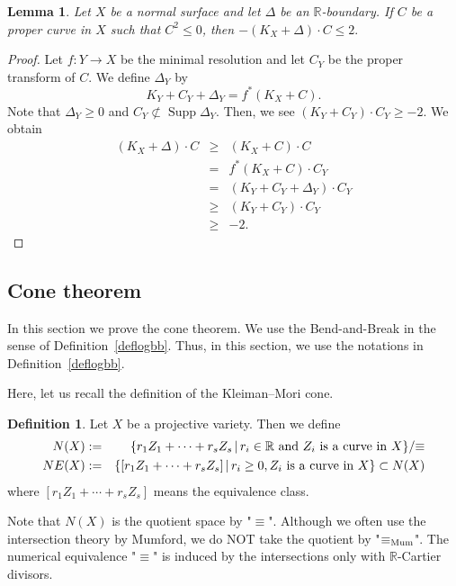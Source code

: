 \documentclass[12pt,twoside]{amsart}
\newcommand{\Supp}[0]{{\operatorname{Supp}}}
\newtheorem{lem}[thm]{Lemma}
\theoremstyle{definition}
\newtheorem{dfn}[thm]{Definition}
\begin{document}
\begin{lem}\label{negative-length2}
Let $X$ be a normal surface and 
let $\Delta$ be an $\mathbb R$-boundary. 
If $C$ be a proper curve in $X$ such that $C^2\leq 0$, then $-(K_X+\Delta)\cdot C\leq 2.$
\end{lem}

\begin{proof}
Let $f:Y\to X$ be the minimal resolution and 
let $C_Y$ be the proper transform of $C$. 
We define $\Delta_Y$ by 
$$K_Y+C_Y+\Delta_Y=f^*(K_X+C).$$
Note that $\Delta_Y\geq 0$ and $C_Y\not\subset \Supp \Delta_Y.$ 
Then, we see $(K_Y+C_Y)\cdot C_Y\geq -2.$ 
We obtain 
\begin{eqnarray*}
(K_X+\Delta)\cdot C&\geq&(K_X+C)\cdot C\\
&=&f^*(K_X+C)\cdot C_Y\\
&=&(K_Y+C_Y+\Delta_Y)\cdot C_Y\\
&\geq& (K_Y+C_Y)\cdot C_Y\\
&\geq& -2.
\end{eqnarray*}
\end{proof}


\subsection{Cone theorem}
In this section we prove the cone theorem. 
We use the Bend-and-Break in the sense of Definition~\ref{deflogbb}. 
Thus, in this section, 
we use the notations in Definition~\ref{deflogbb}. 

Here, let us recall the definition of the Kleiman--Mori cone. 

\begin{dfn}
Let $X$ be a projective variety. 
Then we define  
\begin{eqnarray*}
N(X)&:=&\{r_1Z_1+\cdots+r_sZ_s\,|\,r_i\in \mathbb{R}\,\,
{\rm and}\,\,Z_i\,\,{\rm is\,\,a\,\, curve\,\,in\,\,}X\}/{\equiv}\\
NE(X)&:=&\{[r_1Z_1+\cdots+r_sZ_s]\,|\,r_i\geq 0,Z_i\,\,{\rm is\,\, a\,\,curve\,\,in\,\,}X\}\subset N(X)
\end{eqnarray*}
where $[r_1Z_1+\cdots+r_sZ_s]$ means the equivalence class.
\end{dfn}

Note that $N(X)$ is the quotient space by "$\equiv$". 
Although we often use the intersection theory by Mumford, 
we do NOT take the quotient by "$\equiv_{\rm Mum}$". 
The numerical equivalence "$\equiv$" is induced 
by the intersections only with $\mathbb{R}$-Cartier divisors. 
\end{document}
